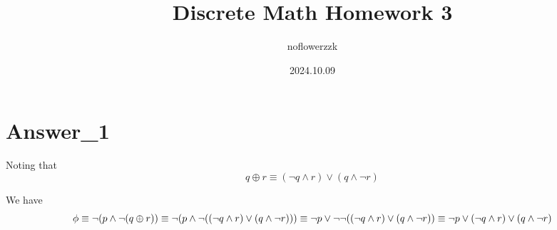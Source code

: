 \documentclass{article}
\title{Discrete Math Homework 3}
\author{noflowerzzk}
\date{2024.10.09}
\begin{document}
\maketitle

\section{Answer\_1}

Noting that 
$$
q \oplus r \equiv (\lnot q \land r) \lor (q \land \lnot r)
$$

We have
\[
\phi \equiv \lnot (p \land \lnot (q \oplus r)) \\
\equiv 
\lnot (p \land \lnot ((\lnot q \land r) \lor (q \land \lnot r))) \\
\equiv
\lnot p \lor \lnot \lnot ((\lnot q \land r) \lor (q \land \lnot r))\\
\equiv
\lnot p \lor (\lnot q \land r) \lor (q \land \lnot r)\\
\]
\end{document}
